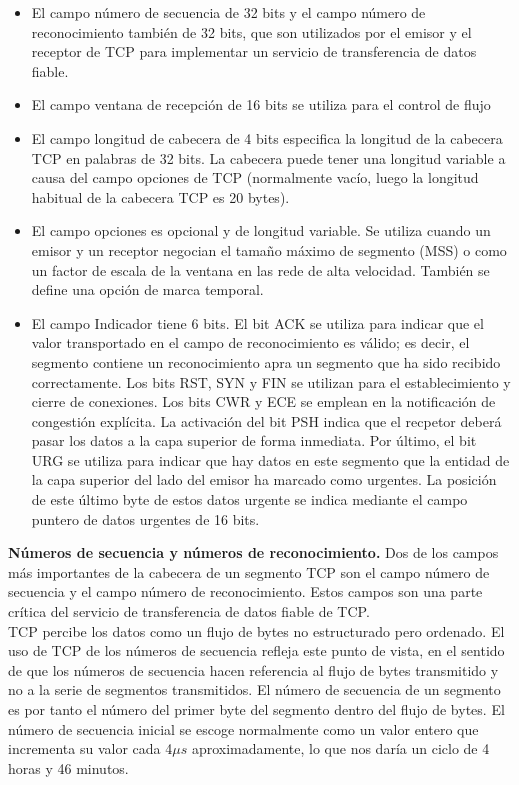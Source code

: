 \documentclass[a4paper,11pt]{article}
\begin{document}
\begin{itemize}
\item El campo número de secuencia de 32 bits y el campo número de reconocimiento también de 32 bits, que son utilizados por el emisor y el receptor de TCP para implementar un servicio de transferencia de datos fiable.

\item El campo ventana de recepción de 16 bits se utiliza para el control de flujo

\item El campo longitud de cabecera de 4 bits especifica la longitud de la cabecera TCP en palabras de 32 bits. La cabecera puede tener una longitud variable a causa del campo opciones de TCP (normalmente vacío, luego la longitud habitual de la cabecera TCP es 20 bytes).

\item El campo opciones es opcional y de longitud variable. Se utiliza cuando un emisor y un receptor negocian el tamaño máximo de segmento (MSS) o como un factor de escala de la ventana en las rede de alta velocidad. También se define una opción de marca temporal.

\item El campo Indicador tiene 6 bits. El bit ACK se utiliza para indicar que el valor transportado en el campo de reconocimiento es válido; es decir, el segmento contiene un reconocimiento apra un segmento que ha sido recibido correctamente. Los bits RST, SYN y FIN se utilizan para el establecimiento y cierre de conexiones. Los bits CWR y ECE se emplean en la notificación de congestión explícita. La activación del bit PSH indica que el recpetor deberá pasar los datos a la capa superior de forma inmediata. Por último, el bit URG se utiliza para indicar que hay datos en este segmento que la entidad de la capa superior del lado del emisor ha marcado como urgentes. La posición de este último byte de estos datos urgente se indica mediante el campo puntero de datos urgentes de 16 bits.
\end{itemize}

\textbf{Números de secuencia y números de reconocimiento.} Dos de los campos más importantes de la cabecera de un segmento TCP son el campo número de secuencia y el campo número de reconocimiento. Estos campos son una parte crítica del servicio de transferencia de datos fiable de TCP. \\

TCP percibe los datos como un flujo de bytes no estructurado pero ordenado. El uso de TCP de los números de secuencia refleja este punto de vista, en el sentido de que los números de secuencia hacen referencia al flujo de bytes transmitido y no a la serie de segmentos transmitidos. El número de secuencia de un segmento es por tanto el número del primer byte del segmento dentro del flujo de bytes. El número de secuencia inicial se escoge normalmente como un valor entero que incrementa su valor cada 4$\mu s$ aproximadamente, lo que nos daría un ciclo de 4 horas y 46 minutos.\\
\end{document}

